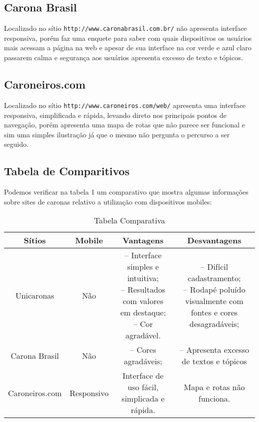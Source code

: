 \documentclass{sig-alternate}
\begin{document}
\subsection{Carona Brasil}
Localizado no sítio {\tt  http://www.caronabrasil.com.br/} não apresenta 
interface responsiva, porém faz uma enquete para saber com quais dispositivos 
os usuários mais acessam a página na web e apesar de sua interface na cor verde 
e azul claro passarem calma e segurança aos usuários apresenta excesso de texto 
e tópicos.

\subsection{Caroneiros.com}
Localizado no sítio {\tt  http://www.caroneiros.com/web/} apresenta 
uma interface responsiva, simplificada e rápida, levando direto nos principais 
pontos de navegação, porém apresenta uma mapa de rotas que não parece ser 
funcional e sim uma simples ilustração já que o mesmo não pergunta o percurso a 
ser seguido.
\subsection{Tabela de Comparitivos}
Podemos verificar na tabela 1 um comparativo que mostra algumas informações 
sobre sites de caronas relativo a utilização com dispositivos mobiles:

\begin{table}[b]
\centering
\hspace{5cm}  \caption{Tabela Comparativa}
\begin{tabular}{|c|c|c|c|} \hline
{\bf Sítios}
&{\bf Mobile}
&{\bf Vantagens}
&{\bf Desvantagens}\\ \hline %
Unicaronas	
&Não			
&\parbox{5cm}{-- Interface simples e intuitiva;\\
-- Resultados com valores em destaque;\\
-- Cor agradável.}
&\parbox{5cm}{-- Difícil cadastramento;\\
-- Rodapé poluído visualmente com fontes e cores desagradáveis;}
\\ \hline
Carona Brasil
&Não 		
& -- Cores agradáveis;
& -- Apresenta excesso de textos e tópicos
\\ \hline
Caroneiros.com
&Responsivo
&Interface de uso fácil, simplicada e rápida.
&Mapa e rotas não funciona.
\\ \hline
\end{tabular}
\end{table}
\end{document}
